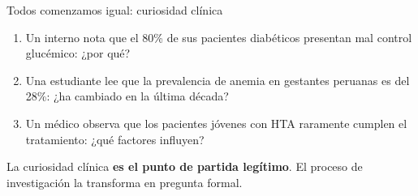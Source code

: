 \documentclass[12pt, aspectratio=169]{beamer}
\begin{document}

\begin{frame}{Todos comenzamos igual: curiosidad clínica}
  \begin{examplebox}
    \small
    \begin{enumerate}
      \item Un interno nota que el 80\% de sus pacientes diabéticos presentan
            mal control glucémico: ¿por qué?
      \item Una estudiante lee que la prevalencia de anemia en gestantes peruanas
            es del 28\%: ¿ha cambiado en la última década?
      \item Un médico observa que los pacientes jóvenes con HTA raramente
            cumplen el tratamiento: ¿qué factores influyen?
    \end{enumerate}
  \end{examplebox}

  \medskip
  \begin{keybox}
    \small
    La curiosidad clínica \textbf{es el punto de partida legítimo}.
    El proceso de investigación la transforma en pregunta formal.
  \end{keybox}
\end{frame}
\end{document}
